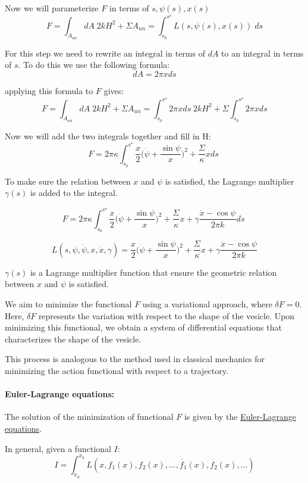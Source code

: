 \documentclass[12pt]{article}
\begin{document}
Now we will parameterize $F$ in terms of $s, \psi(s), x(s)$
$$
F = \int_{A_{un}} dA \; 2kH^2  + \Sigma A_{un} = \int_{s_0}^{s^\star} L(s,\psi(s),x(s)) \; ds
$$


For this step we need to rewrite an integral in terms of $dA$ to an integral in terms of $s$. To do this we use the following formula:
$$
dA=2\pi xds
$$

applying this formula to $F$ gives:
$$
F = \int_{A_{un}} dA \; 2kH^2  + \Sigma A_{un} = \int_{s_0}^{s^\star} 2\pi xds \; 2kH^2 + \Sigma \int_{s_0}^{s^\star} 2\pi x  ds
$$

Now we will add the two integrals together and fill in H:
$$
F = 2\pi \kappa \int_{s_0}^{s^\star} \frac{x}{2} \bigg(\dot{\psi}+\frac{\sin{\psi}}{x}\bigg)^2  + \frac{\Sigma}{\kappa} x ds \;
$$

To make sure the relation between $x$ and $\psi$ is satisfied, the Lagrange multiplier $\gamma(s)$ is added to the integral.

$$
F = 2\pi \kappa \int_{s_0}^{s^\star} \frac{x}{2} \bigg(\dot{\psi}+\frac{\sin{\psi}}{x}\bigg)^2  + \frac{\Sigma}{\kappa} x +\gamma\frac{\dot{x}-\cos \psi}{2\pi k}ds\;
$$
 

$$
L(s,\psi,\dot{\psi},x,\dot{x},\gamma) = \frac{x}{2} \bigg(\dot{\psi}+\frac{\sin \psi}{x}\bigg)^2 + \frac{\Sigma}{\kappa} x + \gamma\frac{\dot{x}-\cos \psi}{2\pi k}
$$

$\gamma(s)$ is a Lagrange multiplier function that ensure the geometric relation between $x$ and $\psi$ is satisfied.


We aim to minimize the functional \( F \) using a variational approach, where \( \delta F = 0 \). Here, \( \delta F \) represents the variation with respect to the shape of the vesicle. Upon minimizing this functional, we obtain a system of differential equations that characterizes the shape of the vesicle.

This process is analogous to the method used in classical mechanics for minimizing the action functional with respect to a trajectory.

\paragraph*{Euler-Lagrange equations:} 

The solution of the minimization of functional $F$ is given by the \href{https://en.wikipedia.org/wiki/Euler%E2%80%93Lagrange_equation}{Euler-Lagrange equations}. 

In general, given a functional $I$:
$$I=\int_{x_a}^{x_b}L(x,f_1(x),f_2(x),\dots,\dot{f_1}(x),\dot{f_2}(x),\dots)$$
\end{document}
